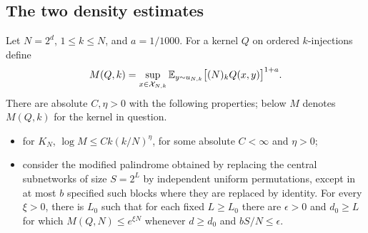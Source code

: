 \subsection{The two density estimates}\label{net:factorial-route}
\begin{lemma}\label{fac:density}
Let $N=2^d$, $1\le k\le N$, and $a=1/1000$. For a kernel $Q$ on ordered $k$-injections define
\[M(Q,k)=\sup_{x\in\mathcal X_{N,k}}\mathbb E_{y\sim u_{N,k}}\big[(N)_kQ(x,y)\big]^{1+a}.\]
There are absolute $C,\eta>0$ with the following properties; below $M$ denotes $M(Q,k)$ for the kernel in question.
\begin{itemize}
\item for $K_N$, $\log M\le C k(k/N)^{\eta}$, for some absolute $C<\infty$ and $\eta>0$;
\item consider the modified palindrome obtained by replacing the central subnetworks of size $S=2^L$ by independent uniform permutations, except in at most $b$ specified such blocks where they are replaced by identity. For every $\xi>0$, there is $L_0$ such that for each fixed $L\ge L_0$ there are $\epsilon>0$ and $d_0\ge L$ for which $M(Q,N)\le e^{\xi N}$ whenever $d\ge d_0$ and $bS/N\le\epsilon$.


\end{itemize}
\end{lemma}
